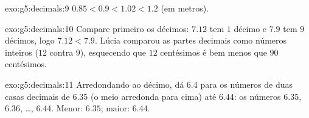 \begin{solution}{exo:g5:decimals:9}
$0.85 < 0.9 < 1.02 < 1.2$ (em metros).
\end{solution}

\begin{solution}{exo:g5:decimals:10}
Compare primeiro os décimos: $7.12$ tem $1$ décimo e $7.9$ tem $9$
décimos, logo $7.12 < 7.9$. Lúcia comparou as partes decimais como
números inteiros ($12$ contra $9$), esquecendo que $12$ centésimos é
bem menos que $90$ centésimos.
\end{solution}

\begin{solution}{exo:g5:decimals:11}
Arredondando ao décimo, dá $6.4$ para os números de duas casas
decimais de $6.35$ (o meio arredonda para cima) até $6.44$: os
números $6.35$, $6.36$, \dots, $6.44$. Menor: $6.35$; maior: $6.44$.
\end{solution}
